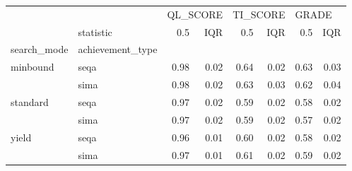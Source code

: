 \begin{tabular}{llrrrrrr}
\toprule
      & {} & \multicolumn{2}{l}{QL\_SCORE} & \multicolumn{2}{l}{TI\_SCORE} & \multicolumn{2}{l}{GRADE} \\
      & statistic &      0.5 &  IQR &      0.5 &  IQR &   0.5 &  IQR \\
search\_mode & achievement\_type &          &      &          &      &       &      \\
\midrule
minbound & seqa &     0.98 & 0.02 &     0.64 & 0.02 &  0.63 & 0.03 \\
      & sima &     0.98 & 0.02 &     0.63 & 0.03 &  0.62 & 0.04 \\
standard & seqa &     0.97 & 0.02 &     0.59 & 0.02 &  0.58 & 0.02 \\
      & sima &     0.97 & 0.02 &     0.59 & 0.02 &  0.57 & 0.02 \\
yield & seqa &     0.96 & 0.01 &     0.60 & 0.02 &  0.58 & 0.02 \\
      & sima &     0.97 & 0.01 &     0.61 & 0.02 &  0.59 & 0.02 \\
\bottomrule
\end{tabular}
